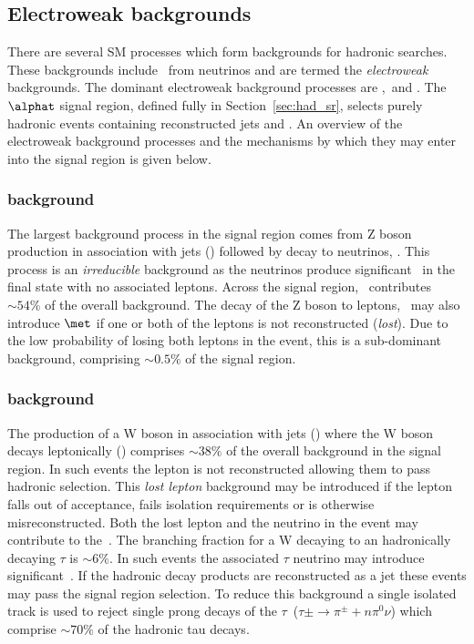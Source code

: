 \subsection{Electroweak backgrounds}
\label{sec:ewk-background-intro}
There are several SM processes which form backgrounds for hadronic searches. These
backgrounds include \met~from neutrinos and are termed the \emph{electroweak} backgrounds. 
The dominant electroweak background processes are \wj,\ttj~and \zj. The $\alphat$
signal region, defined fully in Section~\ref{sec:had_sr}, selects purely hadronic events
containing reconstructed jets and \met. An overview of the electroweak background processes 
and the mechanisms by which they may enter into the signal region is given below. 

\subsubsection{\zj background}

The largest background process in the signal region comes from Z boson production
in association with jets (\zj) followed by decay to neutrinos, \znunu. This process is 
an \emph{irreducible} background as the neutrinos produce significant \met~in the final 
state with no associated leptons. Across the signal region, \znunu~contributes $\sim 54\%$ of 
the overall background. The decay of the Z boson to leptons, \zll~may also introduce $\met$ if 
one or both of the leptons is not reconstructed (\emph{lost}). Due to the low probability of
losing both leptons in the event, this is a sub-dominant background, comprising $\sim 0.5\%$ of the signal region.

\subsubsection{\wj background}

The production of a W boson in association with jets (\wj) where the W boson decays leptonically
(\wl) comprises $\sim 38\%$ of the overall background in the signal region. 
In such events the lepton is not reconstructed allowing them to pass hadronic selection.
This \emph{lost lepton} background may be introduced if the lepton falls out of acceptance,
fails isolation requirements or is otherwise misreconstructed. Both the lost lepton 
and the neutrino in the event may contribute to the~\met. 
The branching fraction for a W decaying to an hadronically decaying $\tau$ is $\sim6\%$.
In such events the associated $\tau$ neutrino may introduce significant~\met. If the hadronic
decay products are reconstructed as a jet these events may pass the signal region selection.
To reduce this background a single isolated track is used to reject single prong decays of the 
$\tau$~($\tau{\pm}\rightarrow\pi^{\pm}+n\pi^{0}\nu$) which comprise $\sim70\%$ of the hadronic tau decays.


